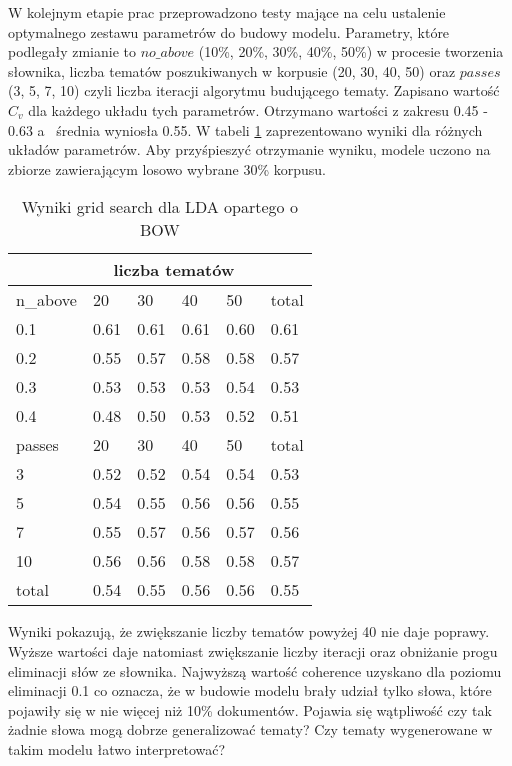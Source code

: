 \documentclass[a4paper,11pt,twoside]{report}
\theoremstyle{definition}
\begin{document}
W kolejnym etapie prac przeprowadzono testy mające na celu ustalenie optymalnego zestawu parametrów do budowy modelu. Parametry, które podlegały zmianie to $no\_above$ (10\%, 20\%, 30\%, 40\%, 50\%) w procesie tworzenia słownika, liczba tematów poszukiwanych w korpusie (20, 30, 40, 50) oraz $passes$ (3, 5, 7, 10) czyli liczba iteracji algorytmu budującego tematy. Zapisano wartość $C_v$ dla każdego układu tych parametrów. Otrzymano wartości z zakresu 0.45 - 0.63 a~ średnia wyniosła 0.55. W tabeli \ref{gs01} zaprezentowano wyniki dla różnych układów parametrów. Aby przyśpieszyć otrzymanie wyniku, modele uczono na zbiorze zawierającym losowo wybrane 30\% korpusu.

\begin{table}  \centering
\begin{tabular}{ |p{2cm}||p{2cm}|p{2cm}|p{2cm}|p{2cm}||p{2cm}| }
 \hline
      &  \multicolumn{4}{|c||}{liczba tematów} &    \\

 \hline
 n\_above & 20 & 30 & 40 & 50 & total \\
 \hline
0.1	&0.61	&0.61	&0.61	&0.60 	&0.61 \\
0.2	&0.55	&0.57	&0.58	&0.58	&0.57\\
0.3	&0.53	&0.53	&0.53	&0.54	&0.53\\
0.4	&0.48	&0.50	&0.53	&0.52	&0.51\\
 \hline \hline
passes & 20 & 30 & 40 & 50 & total \\
\hline
3	&0.52	&0.52	&0.54	&0.54	&0.53\\
5	&0.54	&0.55	&0.56	&0.56	&0.55\\
7	&0.55	&0.57	&0.56	&0.57	&0.56\\
10	&0.56	&0.56	&0.58	&0.58	&0.57\\
\hline \hline
total &	0.54	&0.55	&0.56	&0.56	&0.55\\
\hline
\end{tabular} \caption{Wyniki grid search dla LDA opartego o BOW} \label{gs01}
\end{table}

Wyniki pokazują, że zwiększanie liczby tematów powyżej 40 nie daje poprawy. Wyższe wartości daje natomiast zwiększanie liczby iteracji oraz obniżanie progu eliminacji słów ze słownika. Najwyższą wartość coherence uzyskano dla poziomu eliminacji 0.1 co oznacza, że w budowie modelu brały udział tylko słowa, które pojawiły się w nie więcej niż 10\% dokumentów. Pojawia się wątpliwość czy tak żadnie słowa mogą dobrze generalizować tematy? Czy tematy wygenerowane w takim modelu łatwo interpretować? 
\end{document}
